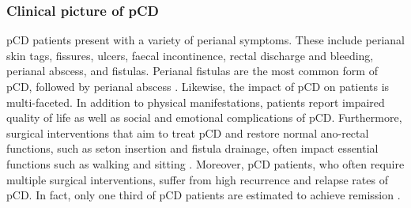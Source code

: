 \subsubsection{Clinical picture of pCD}
pCD patients present with a variety of perianal symptoms. These include perianal skin tags, fissures, ulcers, faecal incontinence, rectal discharge and bleeding, perianal abscess, and fistulas. Perianal fistulas are the most common form of pCD, followed by perianal abscess \cite{Eglinton2012-vx}. Likewise, the impact of pCD on patients is multi-faceted. In addition to physical manifestations, patients report impaired quality of life as well as social and emotional complications of pCD. Furthermore, surgical interventions that aim to treat pCD and restore normal ano-rectal functions, such as seton insertion and fistula drainage, often impact essential functions such as walking and sitting \cite{Adegbola2020-nd}. Moreover, pCD patients, who often require multiple surgical interventions, suffer from high recurrence and relapse rates of pCD. In fact, only one third of pCD patients are estimated to achieve remission \cite{Panes2018-su,Braithwaite2017-zo}. \\


